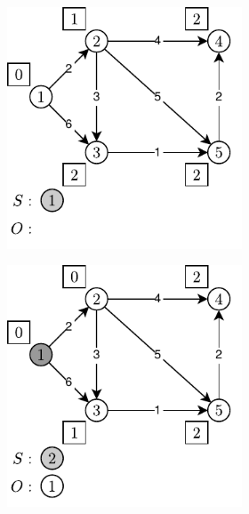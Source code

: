 \begin{figure}[!htbp]
	\centering
	\begin{subfigure}[b]{\textwidth}
		\null\hfill
		\begin{subfigure}[b]{0.3\textwidth}
			\includegraphics[width=\textwidth]{Chapter_II/KHAN-TOPOLOGICAL-SORT-Example/a.pdf}
			\caption{}
			\label{fig:exampleKhan:a}
		\end{subfigure}
		\hfill
		\begin{subfigure}[b]{0.3\textwidth}
			\includegraphics[width=\textwidth]{Chapter_II/KHAN-TOPOLOGICAL-SORT-Example/b.pdf}

\end{subfigure}
\end{subfigure}
\end{figure}
